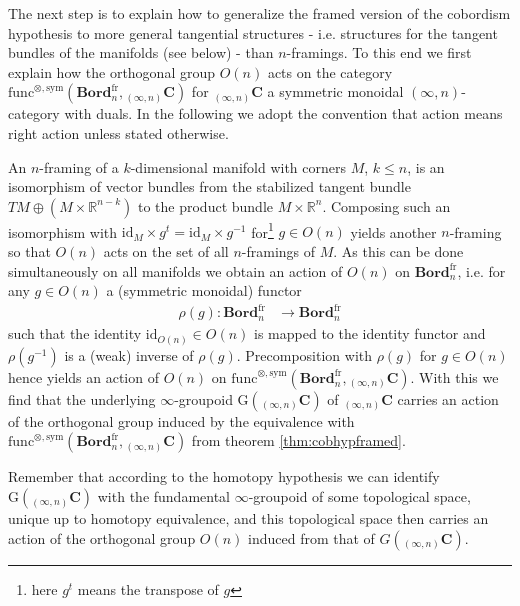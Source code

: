 The next step is to explain how to generalize the framed version of the cobordism hypothesis to more general tangential structures - i.e. structures for the tangent bundles of the manifolds (see below) - than $n$-framings. To this end we first explain how the orthogonal group $O(n)$ acts on the category $\mathrm{func}^{\otimes,\mathrm{sym}}(\mathbf{Bord}_{n}^{\mathrm{fr}},{_{(\infty,n)}}\mathbf{C})$ for ${_{(\infty,n)}}\mathbf{C}$ a symmetric monoidal $(\infty,n)$-category with duals. In the following we adopt the convention that action means right action unless stated otherwise.
\\
\begin{cst}[Sketch]
\label{cst:onaction}
An $n$-framing of a $k$-dimensional manifold with corners $M$, $k \leq n$, is an isomorphism of vector bundles from the stabilized tangent bundle $TM \oplus (M \times \mathbb{R}^{n-k})$ to the product bundle $M \times \mathbb{R}^{n}$. Composing such an isomorphism with $\mathrm{id}_{M} \times g^{t} = \mathrm{id}_{M} \times g^{-1}$ for\footnote{here $g^{t}$ means the transpose of $g$} $g \in O(n)$ yields another $n$-framing so that $O(n)$ acts on the set of all $n$-framings of $M$. As this can be done simultaneously on all manifolds we obtain an action of $O(n)$ on $\mathbf{Bord}_{n}^{\mathrm{fr}}$, i.e. for any $g \in O(n)$ a (symmetric monoidal) functor
\begin{align*}
  \rho(g)
  \colon
  \mathbf{Bord}_{n}^{\mathrm{fr}}
  &\to
  \mathbf{Bord}_{n}^{\mathrm{fr}}
\end{align*}
such that the identity $\mathrm{id}_{O(n)} \in O(n)$ is mapped to the identity functor and $\rho(g^{-1})$ is a (weak) inverse of $\rho(g)$. Precomposition with $\rho(g)$ for $g \in O(n)$ hence yields an action of $O(n)$ on $\mathrm{func}^{\otimes,\mathrm{sym}}(\mathbf{Bord}_{n}^{\mathrm{fr}},{_{(\infty,n)}}\mathbf{C})$. With this we find that the underlying $\infty$-groupoid $\mathrm{G}({_{(\infty,n)}}\mathbf{C})$ of ${_{(\infty,n)}}\mathbf{C}$ carries an action of the orthogonal group induced by the equivalence with $\mathrm{func}^{\otimes,\mathrm{sym}}(\mathbf{Bord}_{n}^{\mathrm{fr}},{_{(\infty,n)}}\mathbf{C})$ from theorem \ref{thm:cobhypframed}.
\end{cst}
Remember that according to the homotopy hypothesis we can identify $\mathrm{G}({_{(\infty,n)}}\mathbf{C})$ with the fundamental $\infty$-groupoid of some topological space, unique up to homotopy equivalence, and this topological space then carries an action of the orthogonal group $O(n)$ induced from that of $G({_{(\infty,n)}}\mathbf{C})$.
